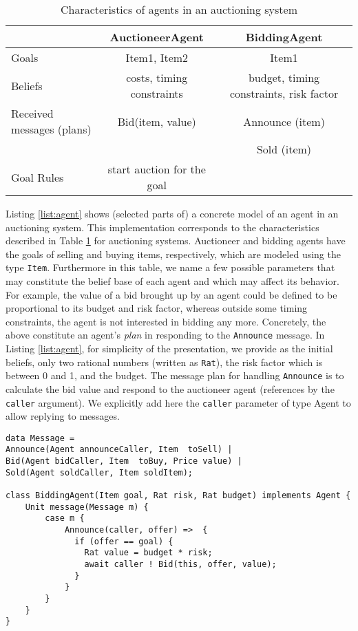 




\begin{table}
	\caption{Characteristics of agents in an auctioning system}\label{tab:auc}
\begin{tabular}{|l|c|c|}
	\hline
	& AuctioneerAgent & BiddingAgent \\
	\hline
Goals & Item1, Item2 & Item1 \\
Beliefs & costs, timing constraints & budget, timing constraints, risk factor \\	
Received messages (plans) & Bid(item, value) & Announce (item) \\
 & & Sold (item) \\
Goal Rules & start auction for the goal & \\
\hline
\end{tabular}
\end{table}



Listing \ref{list:agent} shows (selected parts of) a concrete model of an agent  in an auctioning system.
This implementation corresponds to the characteristics described in Table \ref{tab:auc} for auctioning systems.
Auctioneer and bidding agents have the goals of selling and buying items, respectively, which are modeled using the type \lstinline|Item|. 
Furthermore in this table, we name a few possible parameters that may constitute the belief base of each agent and which may affect its behavior.
For example, the value of a bid brought up by an agent could be defined to be proportional to its budget and risk factor, whereas outside some timing constraints, the agent is not interested in bidding any more. 
Concretely, the above constitute an agent's {\em plan} in responding to the \lstinline|Announce| message.
In Listing \ref{list:agent}, for simplicity of the presentation, we provide as the initial beliefs, only two rational numbers (written as \lstinline|Rat|), the risk factor which is between 0 and 1, and the budget.
The message plan for handling \lstinline|Announce| is to calculate the bid value and respond to the auctioneer agent (references by the \lstinline|caller| argument).
We explicitly add here the \lstinline|caller| parameter of type Agent to allow replying to messages. 


\begin{lstlisting}[caption=Agents in an auctioning system, label=list:agent]
data Message = 
Announce(Agent announceCaller, Item  toSell) | 
Bid(Agent bidCaller, Item  toBuy, Price value) |
Sold(Agent soldCaller, Item soldItem);

class BiddingAgent(Item goal, Rat risk, Rat budget) implements Agent {
	Unit message(Message m) {
		case m {
			Announce(caller, offer) =>  {
			  if (offer == goal) {
			    Rat value = budget * risk;
			    await caller ! Bid(this, offer, value);
			  } 
			}
		}
	}
}
\end{lstlisting}

